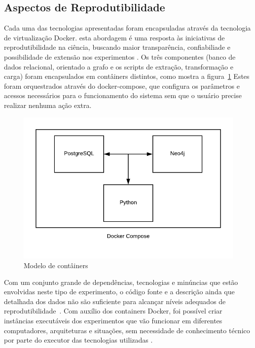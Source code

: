 \documentclass[sigconf]{acmart}
\begin{document}
\subsection{Aspectos de Reprodutibilidade}

Cada uma das tecnologias apresentadas foram encapsuladas através da tecnologia de virtualização Docker. esta abordagem é uma resposta às iniciativas de reprodutibilidade na ciência, buscando maior transparência, confiabiliade e possibilidade de extensão nos experimentos \cite{freire2012}. Os três componentes (banco de dados relacional, orientado a grafo e os scripts de extração, transformação e carga) foram encapsulados em contâiners distintos, como mostra a figura~\ref{fig:docker-model} Estes foram orquestrados através do docker-compose, que configura os parâmetros e acessos necessários para o funcionamento do sistema sem que o usuário precise realizar nenhuma ação extra.

\begin{figure}[!htbp]
 \includegraphics[width=\columnwidth]{docker-model}
 \caption{Modelo de contâiners}\label{fig:docker-model}
\end{figure}


Com um conjunto grande de dependências, tecnologias e minúncias que estão envolvidas neste tipo de experimento, o código fonte e a descrição ainda que detalhada dos dados não são suficiente para alcançar níveis adequados de reprodutibilidade~\cite{ince2012}. Com auxílio dos containers Docker, foi possível criar instâncias executáveis dos experimentos que vão funcionar em diferentes computadores, arquiteturas e situações, sem necessidade de conhecimento técnico por parte do executor das tecnologias utilizadas \cite{boettiger2015}.
\end{document}
